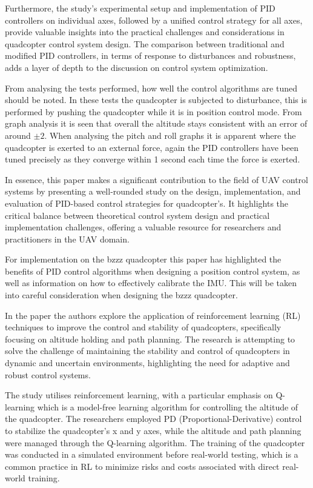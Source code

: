 \documentclass{report}
\begin{document}
Furthermore, the study's experimental setup and implementation of PID
controllers on individual axes, followed by a unified control strategy for all
axes, provide valuable insights into the practical challenges and considerations
in quadcopter control system design. The comparison between traditional and
modified PID controllers, in terms of response to disturbances and robustness,
adds a layer of depth to the discussion on control system optimization.

From analysing the tests performed, how well the control algorithms are tuned
should be noted. In these tests the quadcopter is subjected to disturbance, this
is performed by pushing the quadcopter while it is in position control mode.
From graph analysis it is seen that overall the altitude stays consistent with
an error of around \(\pm2\). When analysing the pitch and roll graphs it is
apparent where the quadcopter is exerted to an external force, again the PID
controllers have been tuned precisely as they converge within 1 second each time
the force is exerted. 

In essence, this paper makes a significant contribution to the field of UAV
control systems by presenting a well-rounded study on the design,
implementation, and evaluation of PID-based control strategies for quadcopter's.
It highlights the critical balance between theoretical control system design and
practical implementation challenges, offering a valuable resource for
researchers and practitioners in the UAV domain.

For implementation on the bzzz quadcopter this paper has highlighted the
benefits of PID control algorithms when designing a position control system, as
well as information on how to effectively calibrate the IMU. This will be taken
into careful consideration when designing the bzzz quadcopter.

In the paper \cite{ReinforcementLearning} the authors  explore the application of reinforcement
learning (RL) techniques to improve the control and stability of quadcopters,
specifically focusing on altitude holding and path planning. The research is
attempting to solve the challenge of maintaining the stability and control of
quadcopters in dynamic and uncertain environments, highlighting the need for
adaptive and robust control systems.

The study utilises reinforcement learning, with a particular emphasis on Q-learning which is a model-free learning algorithm for controlling the altitude
of the quadcopter. The researchers employed PD (Proportional-Derivative) control
to stabilize the quadcopter's x and y axes, while the altitude and path planning
were managed through the Q-learning algorithm. The training of the quadcopter
was conducted in a simulated environment before real-world testing, which is a
common practice in RL to minimize risks and costs associated with direct
real-world training.
\end{document}
